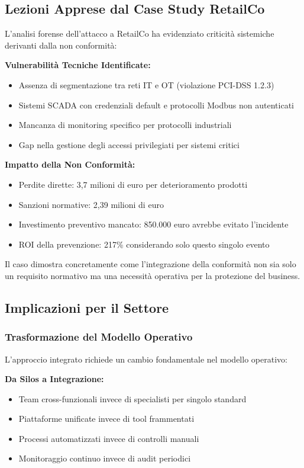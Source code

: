\subsection{Lezioni Apprese dal Case Study RetailCo}

L'analisi forense dell'attacco a RetailCo ha evidenziato criticità sistemiche derivanti dalla non conformità:

\textbf{Vulnerabilità Tecniche Identificate:}
\begin{itemize}
    \item Assenza di segmentazione tra reti IT e OT (violazione PCI-DSS 1.2.3)
    \item Sistemi SCADA con credenziali default e protocolli Modbus non autenticati
    \item Mancanza di monitoring specifico per protocolli industriali
    \item Gap nella gestione degli accessi privilegiati per sistemi critici
\end{itemize}

\textbf{Impatto della Non Conformità:}
\begin{itemize}
    \item Perdite dirette: 3,7 milioni di euro per deterioramento prodotti
    \item Sanzioni normative: 2,39 milioni di euro
    \item Investimento preventivo mancato: 850.000 euro avrebbe evitato l'incidente
    \item ROI della prevenzione: 217\% considerando solo questo singolo evento
\end{itemize}

Il caso dimostra concretamente come l'integrazione della conformità non sia solo un requisito normativo ma una necessità operativa per la protezione del business.

\subsection{Implicazioni per il Settore}

\subsubsection{Trasformazione del Modello Operativo}

L'approccio integrato richiede un cambio fondamentale nel modello operativo:

\textbf{Da Silos a Integrazione:}
\begin{itemize}
    \item Team cross-funzionali invece di specialisti per singolo standard
    \item Piattaforme unificate invece di tool frammentati
    \item Processi automatizzati invece di controlli manuali
    \item Monitoraggio continuo invece di audit periodici
\end{itemize}

